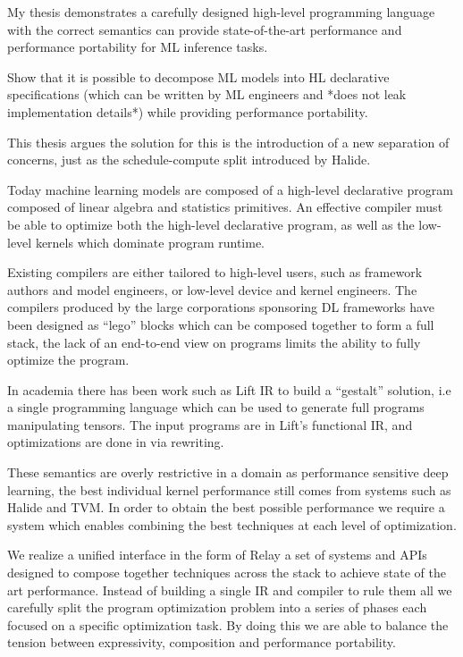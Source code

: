 My thesis demonstrates a carefully designed high-level programming language with the correct semantics can provide state-of-the-art performance and performance portability for ML inference tasks.

Show that it is possible to decompose ML models into HL declarative specifications (which can be written by ML engineers and *does not leak implementation details*) while providing performance portability.


This thesis argues the solution for this is the introduction of a new separation of concerns, just as the schedule-compute split introduced by Halide.

Today machine learning models are composed of a high-level declarative program composed of linear algebra and statistics primitives. An effective compiler must be able to optimize both the high-level declarative program, as well as the low-level kernels which dominate program runtime.

Existing compilers are either tailored to high-level users, such as framework authors and model engineers, or low-level device and kernel engineers. The compilers produced by the large corporations sponsoring DL frameworks have been designed as “lego” blocks which can be composed together to form a full stack, the lack of an end-to-end view on programs limits the ability to fully optimize the program.

In academia there has been work such as Lift IR to build a “gestalt” solution, i.e a single programming language which can be used to generate full programs manipulating tensors.
The input programs are in Lift’s functional IR, and optimizations are done in via rewriting.

These semantics are overly restrictive in a domain as performance sensitive deep learning, the best individual kernel performance still comes from systems such as Halide and TVM.  In order to obtain the best possible performance we require a system which enables combining the best techniques at each level of optimization.

We realize a unified interface in the form of Relay a set of systems and APIs designed to compose together techniques across the stack to achieve state of the art performance.
Instead of building a single IR and compiler to rule them all we carefully split the program optimization problem into a series of phases each focused on a specific optimization task.
By doing this we are able to balance the tension between expressivity, composition and performance portability.

